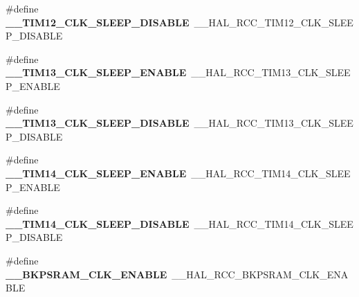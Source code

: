 \begin{DoxyCompactItemize}
\item 
\#define {\bfseries \+\_\+\+\_\+\+T\+I\+M12\+\_\+\+C\+L\+K\+\_\+\+S\+L\+E\+E\+P\+\_\+\+D\+I\+S\+A\+B\+LE}~\+\_\+\+\_\+\+H\+A\+L\+\_\+\+R\+C\+C\+\_\+\+T\+I\+M12\+\_\+\+C\+L\+K\+\_\+\+S\+L\+E\+E\+P\+\_\+\+D\+I\+S\+A\+B\+LE\hypertarget{group___h_a_l___r_c_c___aliased_gaf929e8c66960c8ea6504cfd0045f152b}{}\label{group___h_a_l___r_c_c___aliased_gaf929e8c66960c8ea6504cfd0045f152b}

\item 
\#define {\bfseries \+\_\+\+\_\+\+T\+I\+M13\+\_\+\+C\+L\+K\+\_\+\+S\+L\+E\+E\+P\+\_\+\+E\+N\+A\+B\+LE}~\+\_\+\+\_\+\+H\+A\+L\+\_\+\+R\+C\+C\+\_\+\+T\+I\+M13\+\_\+\+C\+L\+K\+\_\+\+S\+L\+E\+E\+P\+\_\+\+E\+N\+A\+B\+LE\hypertarget{group___h_a_l___r_c_c___aliased_ga77169f2e1382485bcd9659b59f89e124}{}\label{group___h_a_l___r_c_c___aliased_ga77169f2e1382485bcd9659b59f89e124}

\item 
\#define {\bfseries \+\_\+\+\_\+\+T\+I\+M13\+\_\+\+C\+L\+K\+\_\+\+S\+L\+E\+E\+P\+\_\+\+D\+I\+S\+A\+B\+LE}~\+\_\+\+\_\+\+H\+A\+L\+\_\+\+R\+C\+C\+\_\+\+T\+I\+M13\+\_\+\+C\+L\+K\+\_\+\+S\+L\+E\+E\+P\+\_\+\+D\+I\+S\+A\+B\+LE\hypertarget{group___h_a_l___r_c_c___aliased_ga880e7b66246643be14a3c67d5b60ee81}{}\label{group___h_a_l___r_c_c___aliased_ga880e7b66246643be14a3c67d5b60ee81}

\item 
\#define {\bfseries \+\_\+\+\_\+\+T\+I\+M14\+\_\+\+C\+L\+K\+\_\+\+S\+L\+E\+E\+P\+\_\+\+E\+N\+A\+B\+LE}~\+\_\+\+\_\+\+H\+A\+L\+\_\+\+R\+C\+C\+\_\+\+T\+I\+M14\+\_\+\+C\+L\+K\+\_\+\+S\+L\+E\+E\+P\+\_\+\+E\+N\+A\+B\+LE\hypertarget{group___h_a_l___r_c_c___aliased_ga665eb8ea877917808e0be7ef467d1a0d}{}\label{group___h_a_l___r_c_c___aliased_ga665eb8ea877917808e0be7ef467d1a0d}

\item 
\#define {\bfseries \+\_\+\+\_\+\+T\+I\+M14\+\_\+\+C\+L\+K\+\_\+\+S\+L\+E\+E\+P\+\_\+\+D\+I\+S\+A\+B\+LE}~\+\_\+\+\_\+\+H\+A\+L\+\_\+\+R\+C\+C\+\_\+\+T\+I\+M14\+\_\+\+C\+L\+K\+\_\+\+S\+L\+E\+E\+P\+\_\+\+D\+I\+S\+A\+B\+LE\hypertarget{group___h_a_l___r_c_c___aliased_ga71fcbff820f7263e13dbbb2b1ae224dc}{}\label{group___h_a_l___r_c_c___aliased_ga71fcbff820f7263e13dbbb2b1ae224dc}

\item 
\#define {\bfseries \+\_\+\+\_\+\+B\+K\+P\+S\+R\+A\+M\+\_\+\+C\+L\+K\+\_\+\+E\+N\+A\+B\+LE}~\+\_\+\+\_\+\+H\+A\+L\+\_\+\+R\+C\+C\+\_\+\+B\+K\+P\+S\+R\+A\+M\+\_\+\+C\+L\+K\+\_\+\+E\+N\+A\+B\+LE\hypertarget{group___h_a_l___r_c_c___aliased_ga1ef09e51c04879938b3c77bab8fee584}{}\label{group___h_a_l___r_c_c___aliased_ga1ef09e51c04879938b3c77bab8fee584}


\end{DoxyCompactItemize}
